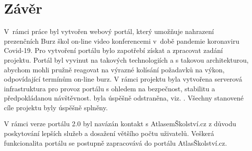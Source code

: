 \chapter*{Závěr}

V~rámci práce byl vytvořen webový portál, který umožňuje nahrazení prezenčních Burz škol on-line video konferencemi v~době pandemie koronaviru Covid-19.
Pro vytvoření portálu bylo zapotřebí získat a zpracovat zadání projektu. 
Portál byl vyvinut na takových technologiích a s takovou architekturou, abychom mohli pružně reagovat na výrazné kolísání požadavků 
na výkon, odpovídající termínům on-line burz.
V rámci projektu byla vytvořena serverová infrastruktura pro provoz portálu s ohledem na bezpečnost, stabilitu a předpokládanou návštěvnost.
 byla úspěšně odstraněna, viz. .
Všechny stanovené cíle projektu byly úspěšně splněny.

V rámci verze portálu 2.0 byl navázán kontakt s AtlasemŠkolství.cz z důvodu poskytování lepších služeb a dosažení většího počtu uživatelů.
Veškerá funkcionalita portálu \bso{} se postupně zapracovává do portálu AtlasŠkolství.cz.



% 
% 
% 
% 

\pagebreak
